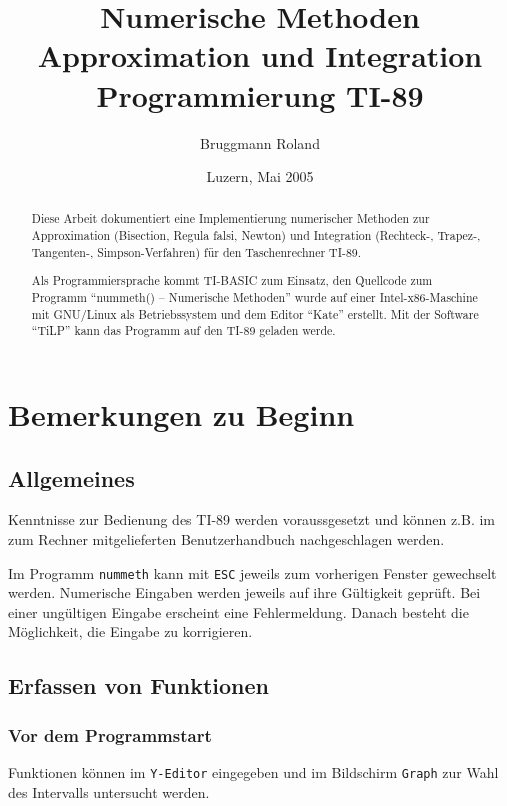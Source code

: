 \documentclass[
	a4paper							%
	,12pt							%
	,twoside						%
	,openright						%
]{scrreprt}							%
\author{Bruggmann Roland}
\title{Numerische Methoden\\Approximation und Integration\\Programmierung TI-89}
\date{Luzern, Mai 2005}
\begin{document}
\maketitle[-1] %

\begin{abstract}
Diese Arbeit dokumentiert eine Implementierung numerischer Methoden zur Approximation (Bisection, Regula falsi, Newton) und Integration (Rechteck-, Trapez-, Tangenten-, Simpson-Verfahren) f\"ur den Taschenrechner TI-89.

Als Programmiersprache kommt TI-BASIC zum Einsatz, den Quellcode zum Programm \enquote{nummeth() -- Numerische Methoden} wurde auf einer Intel-x86-Maschine mit GNU/Linux als Betriebssystem und dem Editor \enquote{Kate} erstellt. Mit der Software \enquote{TiLP} kann das Programm auf den TI-89 geladen werde.

\end{abstract}

\setcounter{secnumdepth}{2}
\tableofcontents

\chapter{Bemerkungen zu Beginn}
\section{Allgemeines}
Kenntnisse zur Bedienung des TI-89 werden voraussgesetzt und k\"onnen z.B. im zum Rechner mitgelieferten Benutzerhandbuch \cite{AVM99} nachgeschlagen werden.

Im Programm \verb|nummeth| kann mit \verb|ESC| jeweils zum vorherigen Fenster gewechselt werden. Numerische Eingaben werden jeweils auf ihre G\"ultigkeit gepr\"uft. Bei einer ung\"ultigen Eingabe erscheint eine Fehlermeldung. Danach besteht die M\"oglichkeit, die Eingabe zu korrigieren.

\section{Erfassen von Funktionen}
\subsection*{Vor dem Programmstart}
Funktionen k\"onnen im \verb|Y-Editor| eingegeben und im Bildschirm \verb|Graph| zur Wahl des Intervalls untersucht werden.
\end{document}
